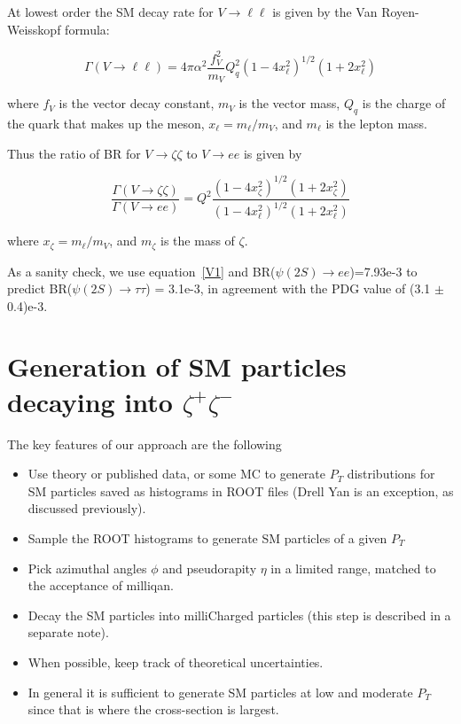 \documentclass[12pt]{article}
\begin{document}
  At lowest order the SM decay rate for $V \to \ell \ell$ is given
  by the Van Royen-Weisskopf formula\cite{VR1,VR2}:

  \begin{equation}
    \Gamma(V \to \ell \ell) = 4 \pi \alpha^2 \frac{f_V^2}{m_V} Q_q^2
    (1-4x_\ell^2)^{1/2} (1+2x_\ell^2)
    \end{equation}

  \noindent where $f_V$ is the vector decay constant, $m_V$ is the
  vector mass, $Q_q$ is the charge of the quark that makes up the meson,
  $x_\ell = m_\ell/m_V$, and $m_\ell$ is the lepton mass.

  \noindent Thus the ratio of BR for $V \to \zeta \zeta$ to $V \to ee$ is
  given by

  \begin{equation} 
    \frac{\Gamma(V \to \zeta \zeta)}{\Gamma(V \to ee)} = Q^2
    \frac{(1-4x_\zeta^2)^{1/2} (1+2x_\zeta^2)}{(1-4x_\ell^2)^{1/2} (1+2x_\ell^2)}
    \label{V1}
    \end{equation}

  \noindent where $x_\zeta = m_\ell/m_V$, and $m_\zeta$ is the mass of $\zeta$.
  
  As a sanity check, we use equation~\ref{V1} and BR($\psi(2S) \to ee$)=7.93e-3
  to predict
  BR($\psi(2S) \to \tau \tau$) = 3.1e-3, in agreement with the PDG value
  of (3.1 $\pm$ 0.4)e-3.


  \section{Generation of SM particles decaying into $\zeta^+ \zeta^-$}


  The key features of our approach are the following
\begin{itemize}
\item Use theory or published data, or some MC to generate $P_T$ distributions for SM
  particles
saved as histograms in ROOT files (Drell Yan is an exception, as discussed previously).
\item Sample the ROOT histograms to generate SM particles of a 
given $P_T$
\item Pick azimuthal angles $\phi$ and pseudorapity $\eta$ in a
  limited 
range, matched to the acceptance of milliqan.
\item Decay the SM particles into milliCharged particles (this 
step is described in a separate note).  
\item When possible, keep track of theoretical uncertainties.
\item In general it is sufficient to generate SM particles at low 
and moderate $P_T$ since that is where the cross-section is largest.
\end{itemize}
\end{document}
